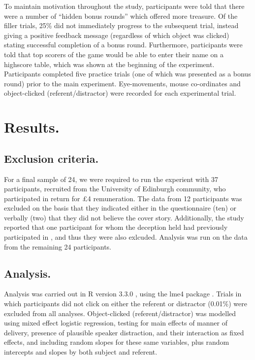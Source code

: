 \documentclass[a4paper,man,natbib]{apa6}
\begin{document}
To maintain motivation throughout the study, participants were told that there were a number of ``hidden bonus rounds'' which offered more treasure. 
Of the filler trials, 25\% did not immediately progress to the subsequent trial, instead giving a positive feedback message (regardless of which object was clicked) stating successful completion of a bonus round. 
Furthermore, participants were told that top scorers of the game would be able to enter their name on a highscore table, which was shown at the beginning of the experiment. 
Participants completed five practice trials (one of which was presented as a bonus round) prior to the main experiment. 
Eye-movements, mouse co-ordinates and object-clicked (referent/distractor) were recorded for each experimental trial.\\

\section{Results.}
\subsection{Exclusion criteria.}
For a final sample of 24, we were required to run the experient with 37 participants, recruited from the University of Edinburgh community, who participated in return for £4 remuneration. 
The data from 12 participants was excluded on the basis that they indicated either in the questionnaire (ten) or verbally (two) that they did not believe the cover story. 
Additionally, the study reported that one participant for whom the deception held had previously participated in \citet{Loy2016}, and thus they were also exlcuded. 
Analysis was run on the data from the remaining 24 participants.\\

\subsection{Analysis.}
Analysis was carried out in R version 3.3.0 \citep{rbase}, using the lme4 package \citep{lme4}. 
Trials in which participants did not click on either the referent or distractor (0.01\%) were excluded from all analyses. 
Object-clicked (referent/distractor) was modelled using mixed effect logistic regression, testing for main effects of manner of delivery, presence of plausible speaker distraction, and their interaction as fixed effects, and including random slopes for these same variables, plus random intercepts and slopes by both subject and referent. \\
\end{document}
